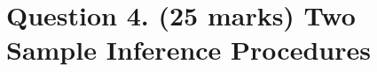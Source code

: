 \documentclass[a4paper,12pt]{article}
\begin{document}
%
%
%
%
%
%
%
%
%
%
%


\section*{Question 4. (25 marks) Two Sample Inference Procedures }
\end{document}
